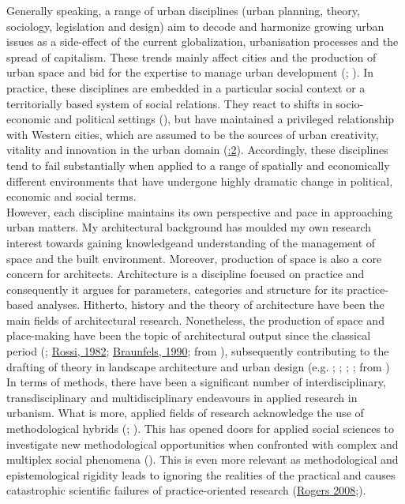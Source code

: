 \documentclass[11pt]{report}
\begin{document}
Generally speaking, a range of urban disciplines (urban planning, theory, sociology, legislation and design) aim to decode and harmonize growing urban issues as a side-effect of the current globalization, urbanisation processes and the spread of capitalism. These trends mainly affect cities and the production of urban space and bid for the expertise to manage urban development (\href{ref}{\citealt{allmendinger_planning_2009}}; \href{ref}{\citealt{faludi_planning_1973}}).
In practice, these disciplines are embedded in a particular social context or a territorially based system of social relations. They react to shifts in socio-economic and political settings  (\href{ref}{\citealt{tsenkova_beyond_2006}}), but have maintained a privileged relationship with Western cities, which are assumed to be the sources of urban creativity, vitality and innovation in the urban domain (\href{ref}{\citealt{robinson_ordinary_2006}:2}). Accordingly, these disciplines tend to fail substantially when applied to a range of spatially and economically different environments that have undergone highly dramatic change in political, economic and social terms. 
\\

However, each discipline maintains its own perspective and pace in approaching urban matters. My architectural background has moulded my own research interest towards gaining knowledgeand understanding of the management of space and the built environment. Moreover, production of space is also a core concern for architects. Architecture is a discipline focused on practice and consequently it argues for parameters, categories and structure for its practice-based analyses.  
Hitherto, history and the theory of architecture have been the main fields of architectural research. 
Nonetheless, the production of space and place-making have been the topic of architectural output since the classical period  (\citealt{Vitruvius, 20BC}; \href{ref}{Rossi, 1982}; \href{ref}{Braunfels, 1990}; from \href{van}{\citealt{van_assche_co-evolutions_2013}}), subsequently contributing to the drafting of theory in landscape architecture and urban design (e.g. \citealt{Rossi, 1982}; \citealt{Lynch, 1981}; \citealt{Braunfels, 1990}; \citealt{Child, 2010}; from \citealt{van_assche_co-evolutions_2013})
\\

In terms of methods, there have been a significant number of interdisciplinary, transdisciplinary and multidisciplinary endeavours in applied research in urbanism. What is more, applied fields of research acknowledge the use of methodological hybrids (\href{ref}{\citealt{datta_paradigm_1994}}; \href{ref}{\citealt{de_lisle_benefits_2011}}). This has opened doors for applied social sciences to investigate new methodological opportunities when confronted with complex and multiplex social phenomena (\href{ref}{\citealt{de_lisle_benefits_2011}}). This is even more relevant as methodological and epistemological rigidity leads to ignoring the realities of the practical and causes catastrophic scientific failures of practice-oriented research (\href{ref}{Rogers 2008};\href{ref}{\citealt{lisle_benefits_2011}}).
\\
\end{document}
